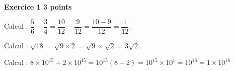 \textbf{Exercice 1 \hfill 3 points}

% 
%
 
Calcul : %
$\dfrac{5}{6} - \dfrac{3}{4} = \dfrac{10}{12} - \dfrac{9}{12} =  \dfrac{10 - 9}{12} = \dfrac{1}{12}$.

\smallskip

Calcul  : %
$\sqrt{18} = \sqrt{9 \times 2} = \sqrt{9} \times \sqrt{2} = 3\sqrt{2}$.
\smallskip
 
Calcul  : %
$8 \times 10^{15} + 2 \times 10^{15} =  10^{15}(8 + 2) = 10^{15} \times 10^1  = 10^{16} = 1 \times 10^{16}$
\bigskip
 
